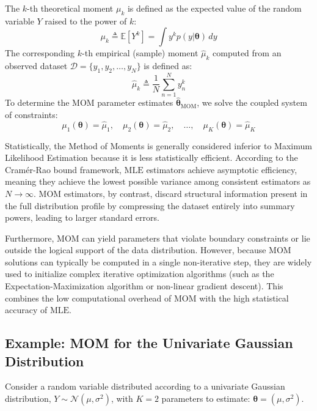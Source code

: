 \documentclass{article}
\begin{document}
The $k$-th theoretical moment $\mu_k$ is defined as the expected value of the random variable $Y$ raised to the power of $k$:
\begin{equation}
\mu_k \triangleq \mathbb{E}[Y^k] = \int y^k p(y | \boldsymbol{\theta}) \, dy
\end{equation}
The corresponding $k$-th empirical (sample) moment $\hat{\mu}_k$ computed from an observed dataset $\mathcal{D} = \{y_1, y_2, \dots, y_N\}$ is defined as:
\begin{equation}
\hat{\mu}_k \triangleq \frac{1}{N} \sum_{n=1}^N y_n^k
\end{equation}
To determine the $\text{MOM}$ parameter estimates $\hat{\boldsymbol{\theta}}_{\text{MOM}}$, we solve the coupled system of constraints:
\begin{equation}
\mu_1(\boldsymbol{\theta}) = \hat{\mu}_1, \quad \mu_2(\boldsymbol{\theta}) = \hat{\mu}_2, \quad \dots, \quad \mu_K(\boldsymbol{\theta}) = \hat{\mu}_K
\end{equation}

Statistically, the Method of Moments is generally considered inferior to Maximum Likelihood Estimation because it is less statistically efficient. According to the Cramér-Rao bound framework, $\text{MLE}$ estimators achieve asymptotic efficiency, meaning they achieve the lowest possible variance among consistent estimators as $N \to \infty$. $\text{MOM}$ estimators, by contrast, discard structural information present in the full distribution profile by compressing the dataset entirely into summary powers, leading to larger standard errors. 

Furthermore, $\text{MOM}$ can yield parameters that violate boundary constraints or lie outside the logical support of the data distribution. However, because $\text{MOM}$ solutions can typically be computed in a single non-iterative step, they are widely used to initialize complex iterative optimization algorithms (such as the Expectation-Maximization algorithm or non-linear gradient descent). This combines the low computational overhead of $\text{MOM}$ with the high statistical accuracy of $\text{MLE}$.

\subsection{Example: MOM for the Univariate Gaussian Distribution}

Consider a random variable distributed according to a univariate Gaussian distribution, $Y \sim \mathcal{N}(\mu, \sigma^2)$, with $K = 2$ parameters to estimate: $\boldsymbol{\theta} = (\mu, \sigma^2)$. 
\end{document}
